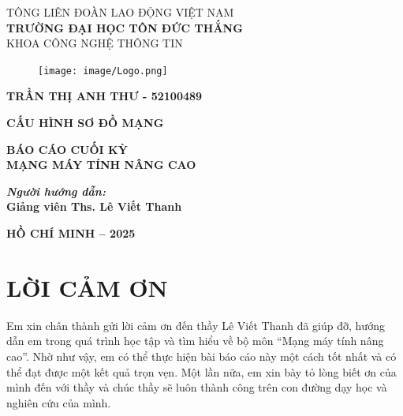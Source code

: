 \documentclass[13pt]{article}
\begin{document}
\newpage
	\fontsize{14pt}{20pt}\selectfont
	\begin{center}
		TÔNG LIÊN ĐOÀN LAO ĐỘNG VIỆT NAM\\\textbf{TRƯỜNG ĐẠI HỌC TÔN ĐỨC THẮNG}
        \\{KHOA CÔNG NGHỆ THÔNG TIN}\\
	\end{center}
	\vspace{1cm}
	\begin{figure}[h]
		\centering
		\texttt{[image: image/Logo.png]}
	\end{figure}
	\vspace{-1cm}
	\vspace{1cm}

    \fontsize{14pt}{20pt}\selectfont
	\begin{center}
		\textbf{TRẦN THỊ ANH THƯ - 52100489 } 
        \\	
	\end{center}
    \vspace{1cm}
    
	\fontsize{24pt}{20pt}\selectfont
	\begin{center}
		\textbf{CẤU HÌNH SƠ ĐỒ MẠNG}
	\end{center}
	\vspace{1cm}
	\fontsize{22pt}{20pt}\selectfont
	\begin{center}
		\textbf{\textbf{BÁO CÁO CUỐI KỲ }\\\textbf{ MẠNG MÁY TÍNH NÂNG CAO  }}	
	\end{center}
    \vspace{2cm}
	\fontsize{16pt}{20pt}\selectfont
	\begin{center}
		\textbf{\textbf{\textit{Người hướng dẫn:\\ }\textbf{Giảng viên Ths. Lê Viết Thanh } 
        }\\}	
	\end{center}
	\vspace{3cm}
	\fontsize{14pt}{20pt}\selectfont
	\begin{center}
		\textbf{HỒ CHÍ MINH – 2025}
	\end{center}


\section*{\centering LỜI CẢM ƠN}
Em xin chân thành gửi lời cảm ơn đến thầy Lê Viết Thanh đã giúp đỡ, hướng dẫn em trong quá trình học tập và tìm hiểu về bộ môn “Mạng máy tính nâng cao”. Nhờ như vậy, em có thể thực hiện bài báo cáo này một cách tốt nhất và có thể đạt được một kết quả trọn vẹn. Một lần nữa, em xin bày tỏ lòng biết ơn của mình đến với thầy và chúc thầy sẽ luôn thành công trên con đường dạy học và nghiên cứu của mình.
\end{document}
